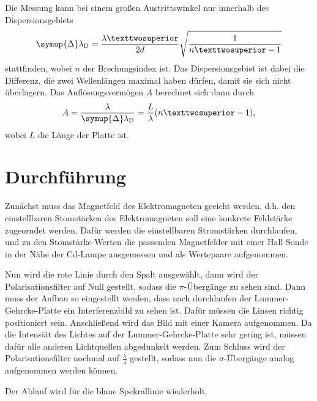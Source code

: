 Die Messung kann bei einem großen Austrittswinkel nur innerhalb des Dispersionsgebiets
\begin{equation}
  \symup{\Delta}\lambda_{\si{D}} = \frac{\lambda²}{2 d} \sqrt{\frac{1}{n²-1}}
  \label{eqn:lD}
\end{equation}
stattfinden, wobei $n$ der Brechungsindex ist. Das Dispersionsgebiet ist dabei die Differenz, die zwei Wellenlängen 
maximal haben dürfen, damit sie sich nicht überlagern.
Das Auflösungsvermögen $A$ berechnet sich dann durch
\begin{equation}
  A = \frac{\lambda}{\symup{\Delta}\lambda_{\si{D}}} = \frac{L}{\lambda} (n²-1),
  \label{eqn:A}
\end{equation} 
wobei $L$ die Länge der Platte ist. 



\section{Durchführung}
\label{sec:Durchführung}

Zunächst muss das Magnetfeld des Elektromagneten geeicht werden, d.h. den einstellbaren Stomstärken des 
Elektromagneten soll eine konkrete Feldstärke zugeorndet werden. Dafür werden die einstellbaren Stromstärken
durchlaufen, und zu den Stomstärke-Werten die passenden Magnetfelder mit einer Hall-Sonde in der Nähe der 
Cd-Lampe ausgemessen und als Wertepaare aufgenommen. 

Nun wird die rote Linie durch den Spalt ausgewählt, dann wird der Polarisationsfilter auf Null gestellt, 
sodass die $\pi$-Übergänge zu sehen sind.
Dann muss der Aufbau so eingestellt werden, dass nach durchlaufen der Lummer-Gehrcke-Platte ein Interferenzbild 
zu sehen ist. Dafür müssen die Linsen richtig positioniert sein. %
Anschließend wird das Bild mit einer Kamera aufgenommen. Da die Intensiät des Lichtes auf der Lummer-Gehrcke-Platte 
sehr gering ist, müssen dafür alle anderen Lichtquellen abgedunkelt werden. 
Zum Schluss wird der Polarisationsfilter nochmal auf $\frac{\lambda}{4}$ gestellt, 
sodass nun die $\sigma$-Übergänge analog aufgenommen werden können. 

Der Ablauf wird für die blaue Spekrallinie wiederholt.